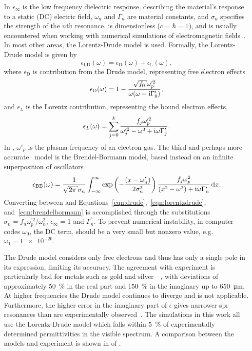 In  $\epsilon_\infty$ is the low frequency
dielectric response, describing the material's response to a static (DC)
electric field, $\omega_n$ and $\Gamma_n$ are material constants, and
$\sigma_n$ specifies the strength of the $n$th resonance.
 is dimensionless ($c=\hbar=1$), and is usually
encountered when working with numerical simulations of electromagnetic
fields~\cite{oskooi2010meep}.  In most other areas, the Lorentz-Drude model is
used.  Formally, the Lorentz-Drude model is given by
\begin{equation}
  \epsilon_\mathrm{LD}(\omega)=\epsilon_\mathrm{D}(\omega)+\epsilon_\mathrm{L}(\omega),
\end{equation}
where $\epsilon_\mathrm{D}$ is contribution from the Drude model, representing
free electron effects
\begin{align}
  \epsilon_\mathrm{D}(\omega)=1-\frac{\sqrt{f_0} \omega_p^{\prime 2}}{\omega(\omega -
  \mi\Gamma_0^\prime)},
  \label{eqn:drude}
\end{align}
and $\epsilon_L$ is the Lorentz contribution, representing the bound
electron effects,
\begin{align}
  \epsilon_L(\omega) =\sum_{j=0}^{k}\frac{f_j\omega_p^{\prime 2}}{\omega_j^{\prime
  2}-\omega^2+{\mathrm{i}}\omega\Gamma_j^\prime}.
  \label{eqn:lorentzdrude}
\end{align}
In , $\omega'_p$ is the plasma frequency of an
electron gas.  The third and perhaps more
accurate~\cite{jahanshahi2014study} model is the
Brendel-Bormann model, based instead on an infinite superposition
of oscillators
\begin{align}
  \epsilon_\text{BB}(\omega) = \frac{1}{\sqrt{2 \pi} \sigma_n} \intinfty
  \exp\left(-\frac{(x-\omega'_n)}{2 \sigma_n^2}\right)
  \frac{f_j \omega_p^2}{(x^2-\omega^2)+\mi \omega \Gamma'_n} \md x.
  \label{eqn:brendelbormann}
\end{align}
Converting between  and
Equations~\ref{eqn:drude},~\ref{eqn:lorentzdrude},
and~\ref{eqn:brendelbormann} is accomplished through the substitutions
$\sigma_n = {f_n \omega_p^{\prime 2}}/{\omega_n^2}$, $\epsilon_\infty=1$ and
$\Gamma_n^\prime$.  To prevent numerical instability, in computer codes
$\omega_0$, the DC term, should be a very small but nonzero value, e.g.
$\omega_1 = \num{1e-20}$.

The Drude model considers only free electrons and thus has only a single pole
in its expression, limiting its accuracy.  The agreement with experiment is
particularly bad for metals such as gold and
silver~\cite{ahmedcomputational}~\cite{jahanshahi2014study}, with deviations
of approximately \SI{50}{\percent} in the real part and \SI{150}{\percent} in
the imaginary up to \SI{650}{\micro\meter}.  At higher frequencies the Drude
model continues to diverge and is not applicable.  Furthermore, the higher
error in the imaginary part of $\epsilon$ gives narrower \gls{spr} resonances than
are experimentally observed~\cite{jahanshahi2014study}.  The simulations in
this work all use the Lorentz-Drude model which falls within \SI{5}{\percent}
of experimentally determined permittivities in the visible spectrum. A
comparison between the models and experiment is shown in
 of .
